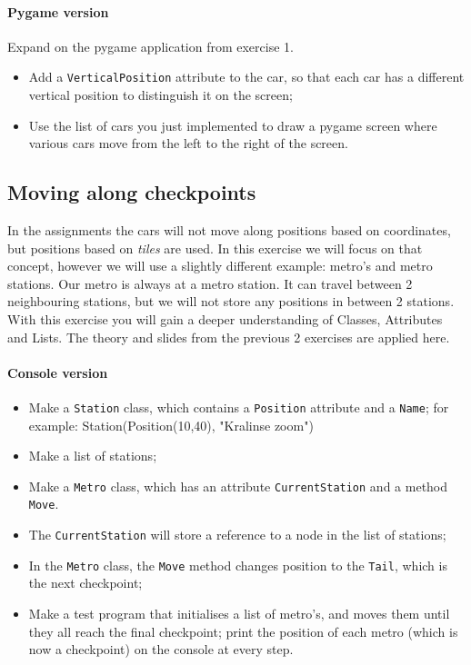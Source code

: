 \documentclass[12pt,a4paper,final]{article}
\begin{document}
			\paragraph*{Pygame version}
			Expand on the pygame application from exercise 1.
			
			\begin{itemize}
				\item Add a \texttt{VerticalPosition} attribute to the car, so that each car has a different vertical position to distinguish it on the screen;
				\item Use the list of cars you just implemented to draw a pygame screen where various cars move from the left to the right of the screen.
			\end{itemize}
			
		\subsection{Moving along checkpoints}
			In the assignments the cars will not move along positions based on coordinates, but positions based on \textit{tiles} are used.
			In this exercise we will focus on that concept, however we will use a slightly different example: metro's and metro stations.
			Our metro is always at a metro station. It can travel between 2 neighbouring stations, but we will not store any positions in between 2 stations.
			With this exercise you will gain a deeper understanding of Classes, Attributes and Lists.
			The theory and slides from the previous 2 exercises are applied here.
			
			\paragraph*{Console version}
			\begin{itemize}
				\item Make a \texttt{Station} class,
				which contains a \texttt{Position} attribute and a \texttt{Name};
				for example: Station(Position(10,40), "Kralinse zoom")
				\item Make a list of stations;
				\item Make a \texttt{Metro} class,
				which has an attribute \texttt{CurrentStation} and a method \texttt{Move}.
				\item The \texttt{CurrentStation} will store a reference to a node in the list of stations;
				\item In the \texttt{Metro} class, the \texttt{Move} method changes position to the \texttt{Tail}, which is the next checkpoint;
				\item Make a test program that initialises a list of metro's, and moves them until they all reach the final checkpoint; print the position of each metro (which is now a checkpoint) on the console at every step.
			\end{itemize}
			
\end{document}
